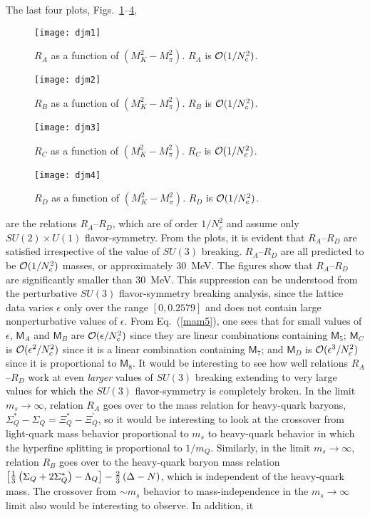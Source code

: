 \documentclass[twocolumn,nofootinbib,prd,aps,superscriptaddress,tightenlines]{revtex4}
\def\mreln{ \mathsf{M} }
\begin{document}
The last four plots, Figs.~\ref{fig:djm1}--\ref{fig:djm4},
%
\begin{figure}
\texttt{[image: djm1]}
\caption{$R_A$ as a function of $(M_K^2 - M_\pi^2)$.  $R_A$ is ${\cal O}(1/N_c^2)$. \label{fig:djm1}}
\end{figure}
%
\begin{figure}
\texttt{[image: djm2]}
\caption{$R_B$ as a function of $(M_K^2 - M_\pi^2)$.   $R_B$ is ${\cal O}(1/N_c^2)$. \label{fig:djm2}}
\end{figure}
%
\begin{figure}
\texttt{[image: djm3]}
\caption{$R_C$ as a function of $(M_K^2 - M_\pi^2)$.   $R_C$ is ${\cal O}(1/N_c^2)$. \label{fig:djm3}}
\end{figure}
%
\begin{figure}
\texttt{[image: djm4]}
\caption{$R_D$ as a function of $(M_K^2 - M_\pi^2)$.   $R_D$ is ${\cal O}(1/N_c^2)$. \label{fig:djm4}}
\end{figure}
%
are the relations $R_A$--$R_D$, which are of order $1/N_c^2$ and assume only $SU(2) \times U(1)$ flavor-symmetry. From the plots, it is evident that $R_A$--$R_D$ are satisfied irrespective of the value of $SU(3)$ breaking.  $R_A$--$R_D$ are all predicted to be ${\cal O}(1/N_c^2)$ masses, or approximately $30$~MeV.  The figures show that $R_A$--$R_D$ are significantly smaller than $30$~MeV.  This suppression can be understood from the perturbative $SU(3)$ flavor-symmetry breaking analysis, since the lattice data varies $\epsilon$ only over the range
$[0,0.2579]$ and does not contain large nonperturbative values of $\epsilon$.  From Eq.~(\ref{mam5}), one sees that for small values
of $\epsilon$, $\mreln_A$ and $\mreln_B$ are ${\cal O}(\epsilon/N_c^2)$ since they are linear combinations containing $\mreln_5$;
$\mreln_C$ is ${\cal O}(\epsilon^2/N_c^2)$ since it is a linear combination containing $\mreln_7$; and $\mreln_D$ is ${\cal O}(\epsilon^3/N_c^2)$ since it is proportional to $\mreln_8$.    
It would be interesting to see how well relations $R_A$--$R_D$ work at even \emph{larger} values of $SU(3)$ breaking extending to very large values for which the $SU(3)$ flavor-symmetry is completely broken. In the limit $m_s \to \infty$, relation $R_A$ goes over to the mass relation for heavy-quark baryons, $\Sigma^*_Q-\Sigma_Q=\Xi^*_Q-\Xi_Q^\prime$, so it would be interesting to look at the crossover 
from light-quark mass behavior proportional to $m_s$ to heavy-quark behavior in which the hyperfine splitting is proportional to $1/m_Q$.  Similarly, in the limit $m_s \to \infty$, relation $R_B$ goes over to the heavy-quark baryon mass relation $\left[ {1 \over 3} \left( \Sigma_Q + 2 \Sigma_Q^* \right) - \Lambda_Q \right] - {2 \over 3} \left( \Delta - N \right)$, which is independent of the heavy-quark mass.  The crossover from $\sim m_s$ behavior to mass-independence in the $m_s \to \infty$ limit also would be interesting to observe.  In addition, it
\end{document}

